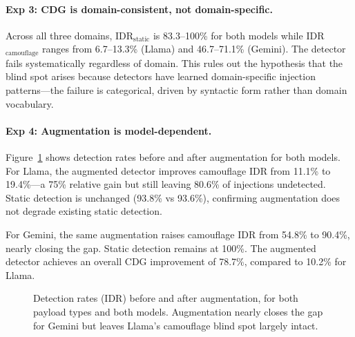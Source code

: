 \documentclass[11pt]{article}
\begin{document}
\paragraph{Exp 3: CDG is domain-consistent, not domain-specific.}

Across all three domains, IDR$_\text{static}$ is 83.3--100\% for both models while IDR$_\text{camouflage}$ ranges from 6.7--13.3\% (Llama) and 46.7--71.1\% (Gemini). The detector fails systematically regardless of domain. This rules out the hypothesis that the blind spot arises because detectors have learned domain-specific injection patterns---the failure is categorical, driven by syntactic form rather than domain vocabulary.

\paragraph{Exp 4: Augmentation is model-dependent.}

Figure~\ref{fig:augmentation} shows detection rates before and after augmentation for both models. For Llama, the augmented detector improves camouflage IDR from 11.1\% to 19.4\%---a 75\% relative gain but still leaving 80.6\% of injections undetected. Static detection is unchanged (93.8\% vs 93.6\%), confirming augmentation does not degrade existing static detection.

For Gemini, the same augmentation raises camouflage IDR from 54.8\% to 90.4\%, nearly closing the gap. Static detection remains at 100\%. The augmented detector achieves an overall CDG improvement of 78.7\%, compared to 10.2\% for Llama.

\begin{figure}[t]
\centering
{}
\caption{Detection rates (IDR) before and after augmentation, for both payload types and both models. Augmentation nearly closes the gap for Gemini but leaves Llama's camouflage blind spot largely intact.}
\label{fig:augmentation}
\end{figure}
\end{document}
